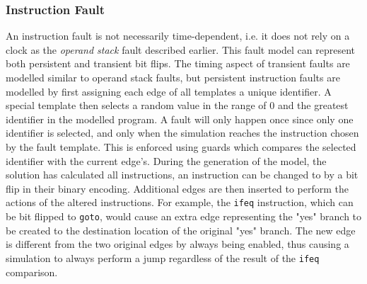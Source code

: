 \subsubsection{Instruction Fault}
An instruction fault is not necessarily time-dependent, i.e. it does not rely on a clock as the \textit{operand stack} fault described earlier. This fault model can represent both persistent and transient bit flips. The timing aspect of transient faults are modelled similar to operand stack faults, but persistent instruction faults are modelled by first assigning each edge of all templates a unique identifier. A special template then selects a random value in the range of $0$ and the greatest identifier in the modelled program. A fault will only happen once since only one identifier is selected, and only when the simulation reaches the instruction chosen by the fault template. This is enforced using guards which compares the selected identifier with the current edge's. During the generation of the model, the solution has calculated all instructions, an instruction can be changed to by a bit flip in their binary encoding. Additional edges are then inserted to perform the actions of the altered instructions. For example, the \texttt{ifeq} instruction, which can be bit flipped to \texttt{goto}, would cause an extra edge representing the "yes" branch to be created to the destination location of the original "yes" branch. The new edge is different from the two original edges by always being enabled, thus causing a simulation to always perform a jump regardless of the result of the \texttt{ifeq} comparison.